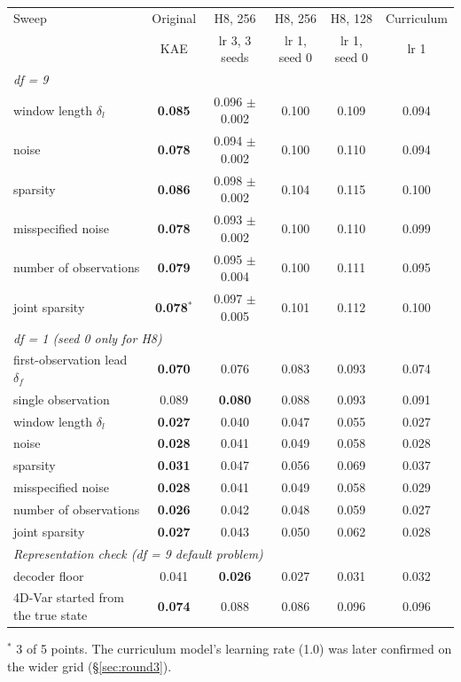 \begin{center}\footnotesize
\begin{tabular}{lccccc}
\toprule
Sweep & Original & H8, 256 & H8, 256 & H8, 128 & Curriculum\\
 & KAE & lr 3, 3 seeds & lr 1, seed 0 & lr 1, seed 0 & lr 1\\
\midrule
\multicolumn{6}{l}{\emph{df = 9}}\\
window length $\delta_l$ & \textbf{0.085} & 0.096 $\pm$ 0.002 & 0.100 & 0.109 & 0.094\\
noise                    & \textbf{0.078} & 0.094 $\pm$ 0.002 & 0.100 & 0.110 & 0.094\\
sparsity                 & \textbf{0.086} & 0.098 $\pm$ 0.002 & 0.104 & 0.115 & 0.100\\
misspecified noise       & \textbf{0.078} & 0.093 $\pm$ 0.002 & 0.100 & 0.110 & 0.099\\
number of observations   & \textbf{0.079} & 0.095 $\pm$ 0.004 & 0.100 & 0.111 & 0.095\\
joint sparsity           & \textbf{0.078}$^\ast$ & 0.097 $\pm$ 0.005 & 0.101 & 0.112 & 0.100\\
\midrule
\multicolumn{6}{l}{\emph{df = 1 (seed 0 only for H8)}}\\
first-observation lead $\delta_f$ & \textbf{0.070} & 0.076 & 0.083 & 0.093 & 0.074\\
single observation       & 0.089 & \textbf{0.080} & 0.088 & 0.093 & 0.091\\
window length $\delta_l$ & \textbf{0.027} & 0.040 & 0.047 & 0.055 & 0.027\\
noise                    & \textbf{0.028} & 0.041 & 0.049 & 0.058 & 0.028\\
sparsity                 & \textbf{0.031} & 0.047 & 0.056 & 0.069 & 0.037\\
misspecified noise       & \textbf{0.028} & 0.041 & 0.049 & 0.058 & 0.029\\
number of observations   & \textbf{0.026} & 0.042 & 0.048 & 0.059 & 0.027\\
joint sparsity           & \textbf{0.027} & 0.043 & 0.050 & 0.062 & 0.028\\
\midrule
\multicolumn{6}{l}{\emph{Representation check (df = 9 default problem)}}\\
decoder floor            & 0.041 & \textbf{0.026} & 0.027 & 0.031 & 0.032\\
4D-Var started from the true state & \textbf{0.074} & 0.088 & 0.086 & 0.096 & 0.096\\
\bottomrule
\end{tabular}
\end{center}
{\footnotesize $^\ast$ 3 of 5 points. The curriculum model's learning rate (1.0) was later confirmed
on the wider grid (\S\ref{sec:round3}).}

